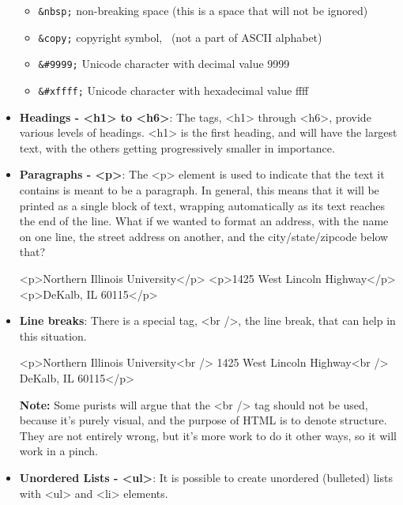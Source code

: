 \documentclass{report}
\begin{document}
\begin{itemize}
\begin{itemize}
            \item \texttt{\&nbsp;} non-breaking space (this is a space that will not be ignored)
            \item \texttt{\&copy;} copyright symbol, \textcopyright\ (not a part of ASCII alphabet)
            \item \texttt{\&\#9999;} Unicode character with decimal value 9999
            \item \texttt{\&\#xffff;} Unicode character with hexadecimal value ffff
        \end{itemize}
    \item \textbf{Headings - <h1> to <h6>}: The tags, <h1> through <h6>, provide various levels of headings. <h1> is the first heading, and will have the largest text, with the others getting progressively smaller in importance.
    \item \textbf{Paragraphs - <p>}: The <p> element is used to indicate that the text it contains is meant to be a paragraph. In general, this means that
        it will be printed as a single block of text, wrapping automatically as its text reaches the end of the line.
        \bigbreak \noindent 
        What if we wanted to format an address, with the name on one line, the street address on another, and the city/state/zipcode below that?
        \bigbreak \noindent 
        \begin{htmlcode}
            <p>Northern Illinois University</p>
            <p>1425 West Lincoln Highway</p>
            <p>DeKalb, IL 60115</p>
        \end{htmlcode}
    \item \textbf{Line breaks}: There is a special tag, <br />, the line break, that can help in this situation.
        \bigbreak \noindent 
        \begin{htmlcode}
            <p>Northern Illinois University<br />
                1425 West Lincoln Highway<br />
                DeKalb, IL 60115</p>
        \end{htmlcode}
        \bigbreak \noindent 
        \textbf{Note:} Some purists will argue that the <br /> tag should not be used, because it's purely visual, and the purpose of HTML is to denote structure. They are not entirely wrong, but it's more work to do it other ways, so it will work in a pinch.
    \item \textbf{Unordered Lists - <ul>}: It is possible to create unordered (bulleted) lists with <ul> and <li> elements.
        \bigbreak \noindent 
        \begin{htmlcode}

\end{htmlcode}
\end{itemize}
\end{document}
